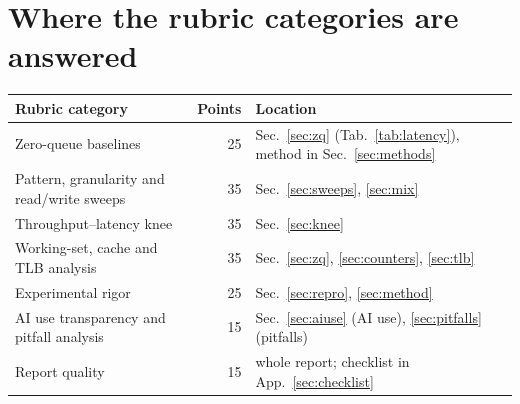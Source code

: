 \documentclass{article}
\begin{document}
\section{Where the rubric categories are answered}\label{sec:rubric}
\begin{center}\small
\begin{tabular}{p{6.0cm}rp{7.6cm}}
\toprule
\textbf{Rubric category} & \textbf{Points} & \textbf{Location} \\
\midrule
Zero-queue baselines & 25 & Sec.~\ref{sec:zq} (Tab.~\ref{tab:latency}), method in Sec.~\ref{sec:methods} \\
Pattern, granularity and read/write sweeps & 35 & Sec.~\ref{sec:sweeps}, \ref{sec:mix} \\
Throughput--latency knee & 35 & Sec.~\ref{sec:knee} \\
Working-set, cache and TLB analysis & 35 & Sec.~\ref{sec:zq}, \ref{sec:counters}, \ref{sec:tlb} \\
Experimental rigor & 25 & Sec.~\ref{sec:repro}, \ref{sec:method} \\
AI use transparency and pitfall analysis & 15 & Sec.~\ref{sec:aiuse} (AI use), \ref{sec:pitfalls} (pitfalls) \\
Report quality & 15 & whole report; checklist in App.~\ref{sec:checklist} \\
\bottomrule
\end{tabular}
\end{center}
\end{document}
